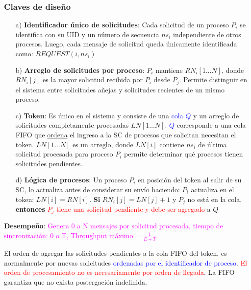 \subsubsection{Claves de diseño}
\begin{itemize}
    \item[a)] \textbf{Identificador único de solicitudes}: Cada solicitud de un proceso $P_i$ se identifica con su UID y un número de secuencia $ns_i$ independiente de otros procesos. Luego, cada mensaje de solicitud queda únicamente identificada como: $REQUEST(i, ns_i)$
    \item[b)] \textbf{Arreglo de solicitudes por proceso}: $P_i$ mantiene $RN_i[1\ldots N]$, donde $RN_i[j]$ es la mayor solicitud recibida por $P_i$ desde $P_j$. Permite distinguir en el sistema entre solicitudes a\~{n}ejas y solicitudes recientes de un mismo proceso.
    \item[c)] \textbf{Token}: Es único en el sistema y consiste de una \textcolor{blue}{cola $Q$} y un arreglo de solicitudes completamente procesadas $LN[1 \ldots N]$. \textcolor{blue}{$Q$} corresponde a una cola FIFO que \underline{ordena} el ingreso a la SC de procesos que solicitan necesitan el token.  $LN[1 \ldots N]$ es un arreglo, donde $LN[i]$ contiene $ns_i$ de última solicitud procesada para proceso $P_i$  permite determinar qué procesos tienen solicitudes pendientes.
    \item[d)] \textbf{Lógica de procesos}: Un proceso $P_i$ en posición del token al salir de su SC, lo actualiza antes de considerar su envío haciendo: $P_i$ actualiza en el token: $LN[i] = RN[i]$. \textbf{Si} $RN_i[j] = LN[j] + 1$ y $P_j$ no está en la cola, \textbf{entonces} \textcolor{red}{$P_j$ tiene una solicitud pendiente y debe ser agregado }a $Q$
\end{itemize}

\textbf{Desempeño}: \textcolor{magenta}{Genera 0 a N mensajes por solicitud procesada, tiempo de sincronización: 0 o T, Throughput máximo = $\frac{1}{E+T}$}

El orden de agregar las solicitudes pendientes a la cola FIFO del token, es normalmente por nuevas solicitudes \textcolor{blue}{ordenadas por el identificador de proceso}. \textcolor{red}{El orden de procesamiento no es necesariamente por orden de llegada}. La FIFO garantiza que no exista postergación indefinida. 